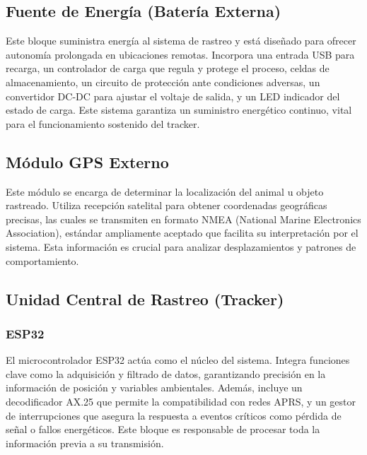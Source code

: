 \documentclass[conference]{IEEEtran}
\begin{document}
\vspace{2mm}

\subsection{Fuente de Energía (Batería Externa)}

Este bloque suministra energía al sistema de rastreo y está diseñado para ofrecer autonomía prolongada en ubicaciones remotas. Incorpora una entrada USB para recarga, un controlador de carga que regula y protege el proceso, celdas de almacenamiento, un circuito de protección ante condiciones adversas, un convertidor DC-DC para ajustar el voltaje de salida, y un LED indicador del estado de carga. Este sistema garantiza un suministro energético continuo, vital para el funcionamiento sostenido del tracker.

\vspace{2mm}

\subsection{Módulo GPS Externo}

Este módulo se encarga de determinar la localización del animal u objeto rastreado. Utiliza recepción satelital para obtener coordenadas geográficas precisas, las cuales se transmiten en formato NMEA (National Marine Electronics Association), estándar ampliamente aceptado que facilita su interpretación por el sistema. Esta información es crucial para analizar desplazamientos y patrones de comportamiento.

\vspace{2mm}

\subsection{Unidad Central de Rastreo (Tracker)}

\subsubsection*{ESP32}

El microcontrolador ESP32 actúa como el núcleo del sistema. Integra funciones clave como la adquisición y filtrado de datos, garantizando precisión en la información de posición y variables ambientales. Además, incluye un decodificador AX.25 que permite la compatibilidad con redes APRS, y un gestor de interrupciones que asegura la respuesta a eventos críticos como pérdida de señal o fallos energéticos. Este bloque es responsable de procesar toda la información previa a su transmisión.
\end{document}
